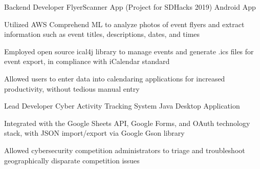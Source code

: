 \begin{cventries}
\cventry
{Backend Developer} %
{FlyerScanner App (Project for SDHacks 2019)} %
{Android App} %
{} %
{
  \begin{cvitems} %
    \item {Utilized AWS Comprehend ML to analyze photos of event flyers and extract information such as event titles, descriptions, dates, and times}
    \item {Employed open source ical4j library to manage events and generate .ics files for event export, in compliance with iCalendar standard}
    \item {Allowed users to enter data into calendaring applications for increased productivity, without tedious manual entry}
  \end{cvitems}
}

\cventry
{Lead Developer} %
{Cyber Activity Tracking System} %
{Java Desktop Application} %
{} %
{
  \begin{cvitems} %
    \item {Integrated with the Google Sheets API, Google Forms, and OAuth technology stack, with JSON import/export via Google Gson library}
    \item {Allowed cybersecurity competition administrators to triage and troubleshoot geographically disparate competition issues}
  \end{cvitems}
}

\end{cventries}
